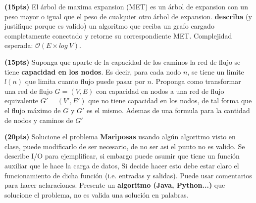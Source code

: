 \documentclass[12pt, a4paper]{exam}
\begin{document}
\begin{questions}
	\pointsdroppedatright
	\question \textbf{(15pts)}  El árbol de maxima expansion (MET) es un árbol de
	expansion con un peso mayor o igual que el peso de cualquier otro árbol de expansion.
	\textbf{describa} (y justifique porque es valido) un algoritmo que reciba un grafo
	cargado completamente conectado y retorne su correspondiente MET. Complejidad
	esperada: \textbf{$\mathcal{O}(E \times log \ V)$}.

	\question  \textbf{(15pts)} Suponga que aparte de la capacidad de los caminos la red
    de flujo se tiene \textbf{capacidad en los nodos}. Es decir, para cada nodo $n$, se
    tiene un limite $l(n)$ que limita cuanto flujo puede pasar por $n$. Proponga como
    transformar una red de flujo $G=(V,E)$ con capacidad en nodos a una red de flujo
    equivalente $G'=(V',E')$ que no tiene capacidad en los nodos, de tal forma que el
    flujo máximo de $G$ y $G'$ es el mismo. Ademas de una formula para la cantidad de
    nodos y caminos de $G'$ 


	\question \textbf{(20pts)} Solucione el problema \textbf{Mariposas}  
	usando algún algoritmo visto en clase, puede modificarlo de ser necesario, de no ser
	asi el punto no es valido. Se describe I/O para ejemplificar, si embargo puede asumir
	que tiene un función auxiliar que le hace la carga de datos, Si decide hacer esto debe
	estar claro el funcionamiento de dicha función (i.e. entradas y salidas).  Puede
	usar comentarios para hacer aclaraciones. Presente un \textbf{algoritmo (Java,
	Python...)} que solucione el problema, no es valida una solución en palabras. 
	

\end{questions}

\end{document}
